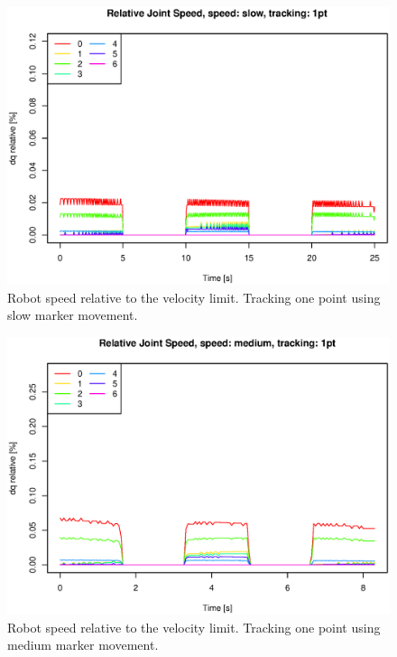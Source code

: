 \begin{figure}[H]
\centering
\includegraphics[width= \fullImageWidth]{graphics/robotics/relativeConfVel_slow_1pt}
\caption{Robot speed relative to the velocity limit. 
Tracking one point using slow marker movement.}
\label{fig:robotspeed_slow_1p}
\end{figure}

\begin{figure}[H]
\centering
\includegraphics[width= \fullImageWidth]{graphics/robotics/relativeConfVel_medium_1pt}
\caption{Robot speed relative to the velocity limit. 
Tracking one point using medium marker movement.}
\label{fig:robotspeed_medium_1p}
\end{figure}

